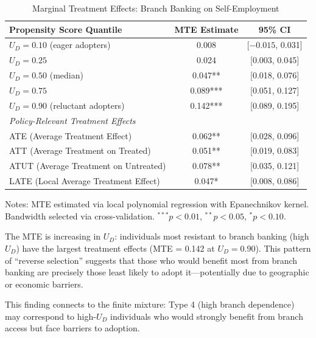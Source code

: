\documentclass[12pt]{article}
\begin{document}
\begin{table}[H]
\centering
\caption{Marginal Treatment Effects: Branch Banking on Self-Employment}
\label{tab:mte_results}
\begin{threeparttable}
\begin{tabular}{lcc}
\toprule
Propensity Score Quantile & MTE Estimate & 95\% CI \\
\midrule
$U_D = 0.10$ (eager adopters) & 0.008 & [$-0.015$, 0.031] \\
$U_D = 0.25$ & 0.024 & [0.003, 0.045] \\
$U_D = 0.50$ (median) & 0.047** & [0.018, 0.076] \\
$U_D = 0.75$ & 0.089*** & [0.051, 0.127] \\
$U_D = 0.90$ (reluctant adopters) & 0.142*** & [0.089, 0.195] \\
\midrule
\multicolumn{3}{l}{\textit{Policy-Relevant Treatment Effects}} \\
ATE (Average Treatment Effect) & 0.062** & [0.028, 0.096] \\
ATT (Average Treatment on Treated) & 0.051** & [0.019, 0.083] \\
ATUT (Average Treatment on Untreated) & 0.078** & [0.035, 0.121] \\
LATE (Local Average Treatment Effect) & 0.047* & [0.008, 0.086] \\
\bottomrule
\end{tabular}
\begin{tablenotes}
\small
\item Notes: MTE estimated via local polynomial regression with Epanechnikov kernel. Bandwidth selected via cross-validation. $^{***}p<0.01$, $^{**}p<0.05$, $^{*}p<0.10$.
\end{tablenotes}
\end{threeparttable}
\end{table}

The MTE is increasing in $U_D$: individuals most resistant to branch banking (high $U_D$) have the largest treatment effects (MTE = 0.142 at $U_D = 0.90$). This pattern of ``reverse selection'' suggests that those who would benefit most from branch banking are precisely those least likely to adopt it---potentially due to geographic or economic barriers.

This finding connects to the finite mixture: Type 4 (high branch dependence) may correspond to high-$U_D$ individuals who would strongly benefit from branch access but face barriers to adoption.

\end{document}
